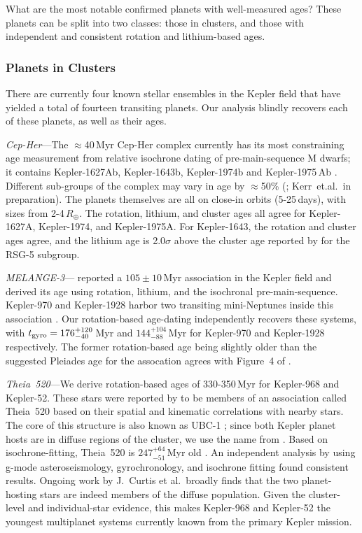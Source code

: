 \documentclass[11pt,twocolumn,tighten]{aastex63}
\begin{document}
What are the most notable confirmed planets with well-measured ages?
These planets can be split into two classes:
those in clusters, and those with independent and consistent
rotation and lithium-based ages.

\subsubsection{Planets in Clusters}
\label{subsec:clusterplanets}

There are currently four known stellar ensembles in the Kepler field that have
yielded a total of fourteen transiting planets.
Our analysis blindly recovers each of these planets, as well as their ages.

{\it Cep-Her}---The $\approx$40\,Myr Cep-Her complex currently has its most
constraining age measurement from relative isochrone dating of
pre-main-sequence M dwarfs; it contains Kepler-1627Ab,
Kepler-1643b, Kepler-1974b and Kepler-1975\,Ab
\citep{Bouma_2022a,Bouma_2022b}.  Different sub-groups of the complex
may vary in age by $\approx$50\% (\citealt{Bouma_2022b};
Kerr~et.al.~in preparation).  The planets themselves are all on
close-in orbits (5-25\,days), with sizes from 2-4\,$R_\oplus$.  The
rotation, lithium, and cluster ages all agree for
Kepler-1627A, Kepler-1974, and Kepler-1975A.  For Kepler-1643, the
rotation and cluster ages agree, and the lithium age is 2.0$\sigma$
above the cluster age reported by \citet{Bouma_2022b} for the RSG-5 subgroup.

{\it MELANGE-3}---\citet{2022AJ....164...88B} reported a $105\pm10$\,Myr association in
the Kepler field and derived its age using rotation,
lithium, and the isochronal pre-main-sequence.  Kepler-970 and
Kepler-1928 harbor two transiting mini-Neptunes inside this
association \citep{2022AJ....164...88B}.  Our rotation-based
age-dating independently recovers these systems, with $t_{\rm
gyro}=176_{-40}^{+120}$\,Myr and $144_{-88}^{+104}$\,Myr for
Kepler-970 and Kepler-1928 respectively.  The former rotation-based age
being slightly older than the suggested Pleiades age for the
assocation agrees with Figure~4 of \citet{2022AJ....164...88B}.

{\it Theia~520}---We derive rotation-based ages of 330-350\,Myr for Kepler-968 and Kepler-52.
These stars were reported by
\citet{2019AJ....158..122K} to be members of an association called Theia~520
based on their spatial and kinematic correlations with nearby stars.
The core of this structure is also known as UBC-1
\citep{2018A&A...618A..59C}; since both Kepler planet hosts
are in diffuse regions of the cluster, we use the name from
\citeauthor{2019AJ....158..122K}.  Based on isochrone-fitting, Theia~520
is $247^{+64}_{-51}$\,Myr old \citep{2019AJ....158..122K}.
An independent analysis by
\citet{2024A&A...681A..13F} using g-mode asteroseismology,
gyrochronology, and isochrone fitting found consistent results.
Ongoing work by J.~Curtis et al.~broadly finds that the two
planet-hosting stars are indeed members of the diffuse population.
Given the cluster-level and individual-star evidence, this makes
Kepler-968 and Kepler-52 the youngest multiplanet systems currently
known from the primary Kepler mission.
\end{document}
